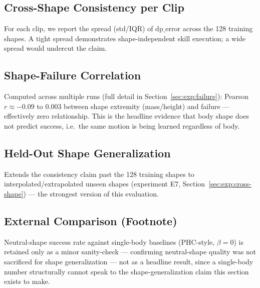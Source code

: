 \subsection{Cross-Shape Consistency per Clip}
For each clip, we report the spread (std/IQR) of $\mathrm{dp\_error}$ across the 128 training
shapes. A tight spread demonstrates shape-independent skill execution; a wide spread would
undercut the claim.

\subsection{Shape-Failure Correlation}
Computed across multiple runs (full detail in Section~\ref{sec:exp:failure}): Pearson
$r \approx -0.09$ to $0.003$ between shape extremity (mass/height) and failure — effectively zero
relationship. This is the headline evidence that body shape does not predict success, i.e.\ the
same motion is being learned regardless of body.

\subsection{Held-Out Shape Generalization}
Extends the consistency claim past the 128 training shapes to interpolated/extrapolated unseen
shapes (experiment E7, Section~\ref{sec:exp:cross-shape}) — the strongest version of this
evaluation. 

\subsection{External Comparison (Footnote)}
Neutral-shape success rate against single-body baselines (PHC-style, $\beta = 0$) is retained only
as a minor sanity-check — confirming neutral-shape quality was not sacrificed for shape
generalization — not as a headline result, since a single-body number structurally cannot speak to
the shape-generalization claim this section exists to make.
